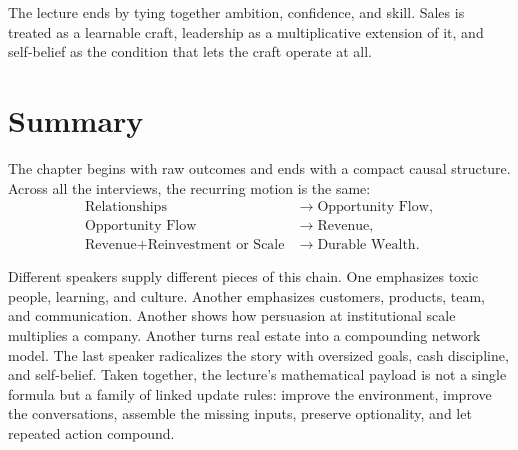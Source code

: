 \begin{remark}
The lecture ends by tying together ambition, confidence, and skill. Sales is treated as a learnable craft, leadership as a multiplicative extension of it, and self-belief as the condition that lets the craft operate at all.
\end{remark}

\section{Summary}

The chapter begins with raw outcomes and ends with a compact causal structure. Across all the interviews, the recurring motion is the same:
\begin{align}
\text{Relationships} &\to \text{Opportunity Flow}, \\
\text{Opportunity Flow} &\to \text{Revenue}, \\
\text{Revenue}+\text{Reinvestment or Scale} &\to \text{Durable Wealth}.
\end{align}

Different speakers supply different pieces of this chain. One emphasizes toxic people, learning, and culture. Another emphasizes customers, products, team, and communication. Another shows how persuasion at institutional scale multiplies a company. Another turns real estate into a compounding network model. The last speaker radicalizes the story with oversized goals, cash discipline, and self-belief. Taken together, the lecture's mathematical payload is not a single formula but a family of linked update rules: improve the environment, improve the conversations, assemble the missing inputs, preserve optionality, and let repeated action compound.